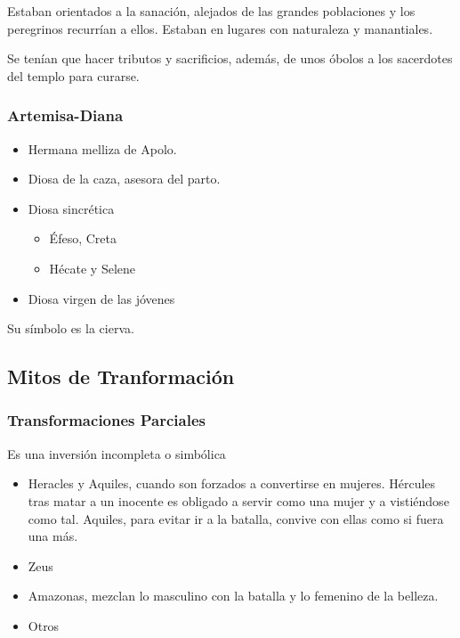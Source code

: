 Estaban orientados a la sanación, alejados de las grandes poblaciones y los peregrinos recurrían a ellos. Estaban en lugares con naturaleza y manantiales.

Se tenían que hacer tributos y sacrificios, además, de unos óbolos a los sacerdotes del templo para curarse. 

\subsubsection{Artemisa-Diana}
\begin{itemize}
    \item Hermana melliza de Apolo.
    \item Diosa de la caza, asesora del parto.
    \item Diosa sincrética
    \begin{itemize}
        \item Éfeso, Creta
        \item Hécate y Selene
    \end{itemize}
    \item Diosa virgen de las jóvenes
\end{itemize}

Su símbolo es la cierva.

\subsection{Mitos de Tranformación}

\subsubsection{Transformaciones Parciales}
Es una inversión incompleta o simbólica
\begin{itemize}
    \item Heracles y Aquiles, cuando son forzados a convertirse en mujeres. Hércules tras matar a un inocente es obligado a servir como una mujer y a vistiéndose como tal. Aquiles, para evitar ir a la batalla, convive con ellas como si fuera una más.
    \item Zeus
    \item Amazonas, mezclan lo masculino con la batalla y lo femenino de la belleza.
    \item Otros
\end{itemize}


